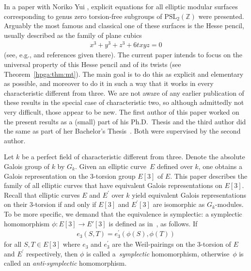 \documentclass[pdftex]{sigma}
\newcommand{\msetp}[1]{{\left({#1}\right)}}					%
\newcommand{\msets}[1]{{\left[{#1}\right]}}					%
\numberwithin{equation}{section}
\begin{document}
In a paper with Noriko Yui \cite{TY2007}, explicit equations for all elliptic modular surfaces corresponding to genus zero torsion-free subgroups of $\mbox{PSL}_2({\mathbb Z})$ were presented. Arguably the most famous and classical one of these surfaces is the Hesse pencil, usually described as the family of plane cubics
\begin{gather*}
x^3+y^3+z^3+6txyz=0
\end{gather*}
(see, e.g., \cite[Table~2]{TY2007} and references given there). The current paper intends to focus on the universal property of this Hesse pencil and of its twists (see Theorem~\ref{hpga:thm:mt}). The main goal is to do this as explicit and elementary as possible, and moreover to do it in such a way that it works in every characteristic different from three. We are not aware of any earlier publication of these results in the special case of characteristic two, so although admittedly not very difficult, those appear to be new. The first author of this paper worked on the present results as a (small) part of his Ph.D.~Thesis \cite{ane} and the third author did the same as part of her Bachelor's Thesis~\cite{tuijp2015}. Both were supervised by the second author.

Let $k$ be a perfect field of characteristic different from three. Denote the absolute Galois group of $k$ by $G_k$. Given an elliptic curve~$E$ defined over $k$, one obtains a Galois representation on the 3-torsion group $E \msets{3}$ of $E$. This paper describes the family of all elliptic curves that have equivalent Galois representations on $E\msets{3}$. Recall that elliptic curves $E$ and $E^\prime$ over $k$ yield equivalent Galois representations on their 3-torsion if and only if $E\msets{3}$ and $E^\prime\msets{3}$ are isomorphic as $G_k$-modules. To be more specific, we demand that the equivalence is symplectic: a symplectic homomorphism $\phi\colon E[3]\to E'[3]$ is defined as in~\cite{kuwata2012}, as follows. If
\begin{gather*}
e_3\msetp{S,T}=e^\prime_3\msetp{\phi\msetp{S},\phi\msetp{T}}
\end{gather*}
for all $S,T\in E\msets{3}$ where $e_3$ and $e^\prime_3$ are the Weil-pairings on the 3-torsion of $E$ and $E^\prime$ respectively, then $\phi$ is called a~\emph{symplectic} homomorphism, otherwise~$\phi$ is called an \emph{anti-symplectic} homomorphism.
\end{document}
